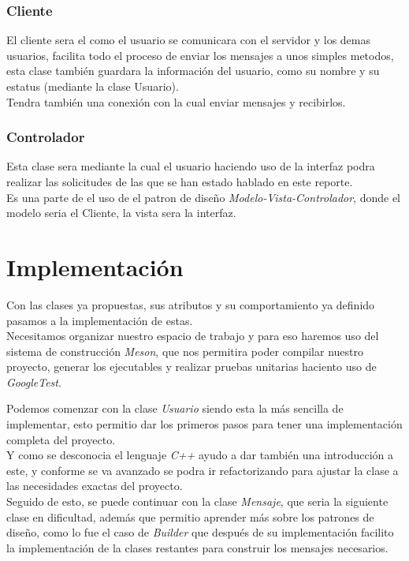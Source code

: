 \documentclass[12pt]{report}
\begin{document}
\subsection{Cliente}
El cliente sera el como el usuario se comunicara con el servidor y los demas usuarios, facilita todo el proceso de enviar los mensajes a unos simples metodos, esta clase también guardara la información del usuario, como su nombre y su estatus (mediante la clase Usuario).\\

Tendra también una conexión con la cual enviar mensajes y recibirlos.\\

\subsection{Controlador}
Esta clase sera mediante la cual el usuario haciendo uso de la interfaz podra realizar las solicitudes de las que se han estado hablado en este reporte.\\

Es una parte de el uso de el patron de diseño \textit{Modelo-Vista-Controlador}, donde el modelo seria el Cliente, la vista sera la interfaz.\\


\chapter{Implementación}
Con las clases ya propuestas, sus atributos y su comportamiento ya definido pasamos a la implementación de estas.\\

Necesitamos organizar nuestro espacio de trabajo y para eso haremos uso del sistema de construcción \textit{Meson}, que nos permitira poder compilar nuestro proyecto, generar los ejecutables y realizar pruebas unitarias haciento uso de \textit{GoogleTest}.

Podemos comenzar con la clase \textit{Usuario} siendo esta la más sencilla de implementar, esto permitio dar los primeros pasos para tener una implementación completa del proyecto.\\

Y como se desconocia el lenguaje \textit{C++} ayudo a dar también una introducción a este, y conforme se va avanzado se podra ir refactorizando para ajustar la clase a las necesidades exactas del proyecto.\\

Seguido de esto, se puede continuar con la clase \textit{Mensaje}, que seria la siguiente clase en dificultad, además que permitio aprender más sobre los patrones de diseño, como lo fue el caso de \textit{Builder} que después de su implementación facilito la implementación de la clases restantes para construir los mensajes necesarios.\\
\end{document}
